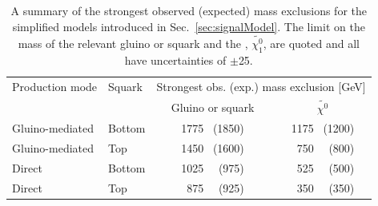 \newcommand{\ph}{\ensuremath{\phantom{1}}}
\begin{table}[tb]
  \caption{A summary of the strongest observed (expected) mass
  exclusions for the simplified models introduced in
  Sec.~\ref{sec:signalModel}. The limit on the mass of the relevant
  gluino or squark and the \LSP, $\tilde{\chi^0_1}$, are quoted and
  all have uncertainties of $\pm$25\GeV.  
  }
  \label{tab:simplified-models-limits}
  \centering
  \footnotesize
  \begin{tabular}{ llcc }
    \hline
    Production mode & Squark        & \multicolumn{2}{c}{Strongest obs. (exp.) mass exclusion [GeV]}\T\B \\
    \cline{3-4}                     
                    &               & Gluino or squark\T\B & $\tilde{\chi^0}$                                               \\
    \hline                          
    Gluino-mediated & Bottom        & 1775 \ph(1850)       & 1175 \ph(1200)                                      \\ 
    Gluino-mediated & Top           & 1450 \ph(1600)       & \ph750 \ph\ph(800)                                  \\ 
    Direct          & Bottom        & 1025 \ph\ph(975)     & \ph525 \ph\ph(500)                                  \\ 
    Direct\B        & Top           & \ph875 \ph\ph(925)   & \ph350 \ph\ph(350)                                  \\
    \hline
 \end{tabular}
\end{table}
